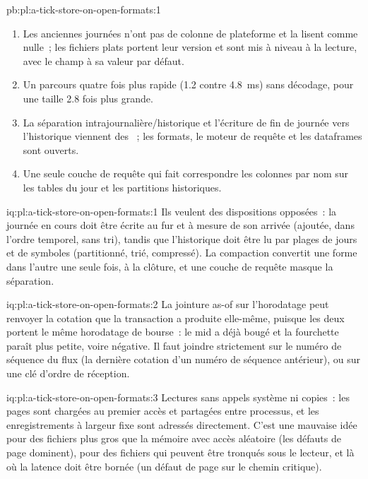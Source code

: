 \begin{solution}{pb:pl:a-tick-store-on-open-formats:1}
\begin{enumerate}
absorbe environ 4.7 milliards d'événements, soit environ un soixante-sixième de la journée prévue du flux d'options.
\item Les anciennes journées n'ont pas de colonne de plateforme et la lisent comme nulle~; les fichiers plats portent leur version et sont mis à niveau à la lecture, avec le
champ à sa valeur par défaut.
\item Un parcours quatre fois plus rapide (1.2 contre 4.8~ms) sans décodage, pour une taille 2.8 fois plus grande.
\item La séparation intrajournalière/historique et l'écriture de fin de journée vers l'historique viennent des ~; les formats, le moteur de requête
et les dataframes sont ouverts.
\item Une seule couche de requête qui fait correspondre les colonnes par nom sur les tables du jour et les partitions historiques.
\end{enumerate}
\end{solution}

\begin{solution}{iq:pl:a-tick-store-on-open-formats:1}
Ils veulent des dispositions opposées~: la journée en cours doit être écrite au fur et à mesure de son arrivée (ajoutée, dans l'ordre temporel, sans tri), tandis que l'historique doit
être lu par plages de jours et de symboles (partitionné, trié, compressé). La compaction convertit une forme dans l'autre une seule fois, à la
clôture, et une couche de requête masque la séparation.
\end{solution}

\begin{solution}{iq:pl:a-tick-store-on-open-formats:2}
La jointure as-of sur l'horodatage peut renvoyer la cotation que la transaction a produite elle-même, puisque les deux portent le même horodatage de bourse~: le mid
a déjà bougé et la fourchette paraît plus petite, voire négative. Il faut joindre strictement sur le numéro de séquence du flux (la dernière cotation d'un
numéro de séquence antérieur), ou sur une clé d'ordre de réception.
\end{solution}

\begin{solution}{iq:pl:a-tick-store-on-open-formats:3}
Lectures sans appels système ni copies~: les pages sont chargées au premier accès et partagées entre processus, et les enregistrements à largeur fixe sont
adressés directement. C'est une mauvaise idée pour des fichiers plus gros que la mémoire avec accès aléatoire (les défauts de page dominent), pour des fichiers qui peuvent être
tronqués sous le lecteur, et là où la latence doit être bornée (un défaut de page sur le chemin critique).
\end{solution}

